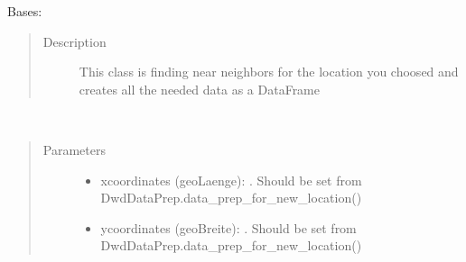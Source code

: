 \documentclass[letterpaper,10pt,english]{sphinxmanual}
\begin{document}
\begin{fulllineitems}
\label{\detokenize{DwdNearNeighbor:DwdNearNeighbor.NearNeighbor}}
\sphinxAtStartPar
Bases: 
\begin{quote}\begin{description}
\item[{Description}] \leavevmode
\sphinxAtStartPar
This class is finding near neighbors for the location you choosed and creates all the needed data as a DataFrame

\end{description}\end{quote}

\begin{fulllineitems}
\label{\detokenize{DwdNearNeighbor:DwdNearNeighbor.NearNeighbor.__init__}}~\begin{quote}\begin{description}
\item[{Parameters}] \leavevmode\begin{itemize}
\item {} 
\sphinxAtStartPar
{} \textendash{} x\sphinxhyphen{}coordinates (geoLaenge): . Should be set from DwdDataPrep.data\_prep\_for\_new\_location()

\item {} 
\sphinxAtStartPar
{} \textendash{} y\sphinxhyphen{}coordinates (geoBreite): . Should be set from DwdDataPrep.data\_prep\_for\_new\_location()


\end{itemize}
\end{description}
\end{quote}
\end{fulllineitems}
\end{fulllineitems}
\end{document}
